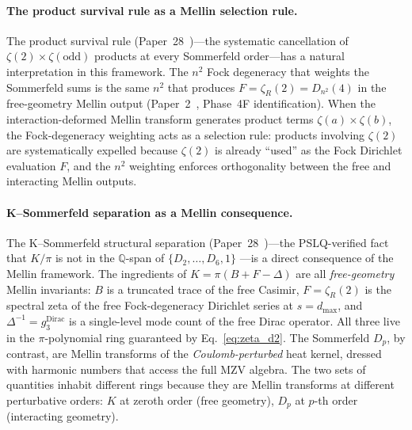 \documentclass[aps,pra,twocolumn,superscriptaddress,longbibliography]{revtex4-2}
\begin{document}
\paragraph{The product survival rule as a Mellin selection rule.}
The product survival rule (Paper~28~\cite{loutey_paper28})---the systematic cancellation
of $\zeta(2) \times \zeta(\text{odd})$ products at every Sommerfeld
order---has a natural interpretation in this framework.  The
$n^2$ Fock degeneracy that weights the Sommerfeld sums is the same
$n^2$ that produces $F = \zeta_R(2) = D_{n^2}(4)$ in the free-geometry
Mellin output (Paper~2~\cite{loutey_paper2}, Phase~4F identification).
When the interaction-deformed Mellin transform generates product
terms $\zeta(a) \times \zeta(b)$, the Fock-degeneracy weighting
acts as a selection rule: products involving $\zeta(2)$ are
systematically expelled because $\zeta(2)$ is already ``used'' as
the Fock Dirichlet evaluation $F$, and the $n^2$ weighting enforces
orthogonality between the free and interacting Mellin outputs.

\paragraph{K--Sommerfeld separation as a Mellin consequence.}
The K--Sommerfeld structural separation
(Paper~28~\cite{loutey_paper28})---the PSLQ-verified fact that
$K/\pi$ is not in the $\mathbb{Q}$-span of $\{D_2, \ldots, D_6, 1\}$%
---is a direct consequence of the Mellin framework.
The ingredients of $K = \pi(B + F - \Delta)$ are all
\emph{free-geometry} Mellin invariants: $B$ is a truncated
trace of the free Casimir, $F = \zeta_R(2)$ is the spectral zeta
of the free Fock-degeneracy Dirichlet series at $s = d_{\max}$,
and $\Delta^{-1} = g_3^{\text{Dirac}}$ is a single-level mode
count of the free Dirac operator.  All three live in the
$\pi$-polynomial ring guaranteed by Eq.~\eqref{eq:zeta_d2}.
The Sommerfeld $D_p$, by contrast, are Mellin transforms of the
\emph{Coulomb-perturbed} heat kernel, dressed with harmonic
numbers that access the full MZV algebra.  The two sets of
quantities inhabit different rings because they are Mellin
transforms at different perturbative orders: $K$ at zeroth
order (free geometry), $D_p$ at $p$-th order (interacting geometry).
\end{document}

